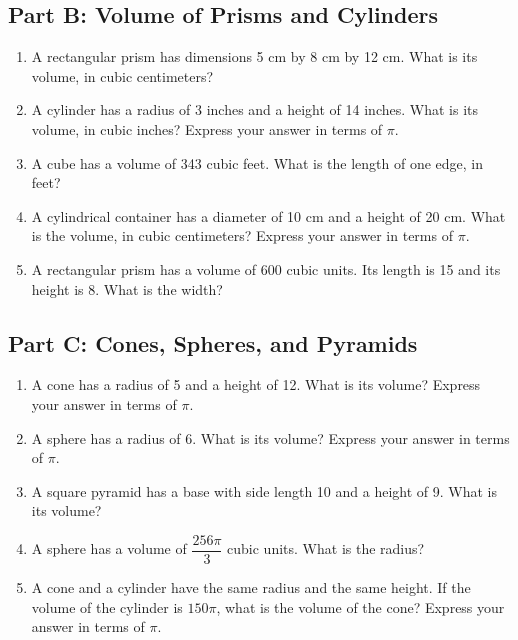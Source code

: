 \documentclass[14pt]{extarticle}
\begin{document}
\subsection*{Part B: Volume of Prisms and Cylinders}
\begin{enumerate}
  \item A rectangular prism has dimensions 5 cm by 8 cm by 12 cm. What is its volume, in cubic centimeters?
  \item A cylinder has a radius of 3 inches and a height of 14 inches. What is its volume, in cubic inches? Express your answer in terms of \(\pi\).
  \item A cube has a volume of 343 cubic feet. What is the length of one edge, in feet?
  \item A cylindrical container has a diameter of 10 cm and a height of 20 cm. What is the volume, in cubic centimeters? Express your answer in terms of \(\pi\).
  \item A rectangular prism has a volume of 600 cubic units. Its length is 15 and its height is 8. What is the width?
\end{enumerate}

\subsection*{Part C: Cones, Spheres, and Pyramids}
\begin{enumerate}
  \item A cone has a radius of 5 and a height of 12. What is its volume? Express your answer in terms of \(\pi\).
  \item A sphere has a radius of 6. What is its volume? Express your answer in terms of \(\pi\).
  \item A square pyramid has a base with side length 10 and a height of 9. What is its volume?
  \item A sphere has a volume of \(\dfrac{256\pi}{3}\) cubic units. What is the radius?
  \item A cone and a cylinder have the same radius and the same height. If the volume of the cylinder is \(150\pi\), what is the volume of the cone? Express your answer in terms of \(\pi\).
\end{enumerate}
\end{document}
